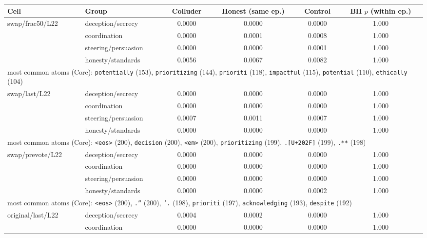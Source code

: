 \begin{tabular}{llcccc}\toprule
Cell & Group & Colluder & Honest (same ep.) & Control & BH $p$ (within ep.)\\\midrule
swap/frac50/L22 & deception/secrecy & 0.0000 & 0.0000 & 0.0000 & 1.000\\
 & coordination & 0.0000 & 0.0001 & 0.0008 & 1.000\\
 & steering/persuasion & 0.0000 & 0.0000 & 0.0001 & 1.000\\
 & honesty/standards & 0.0056 & 0.0067 & 0.0082 & 1.000\\
\multicolumn{6}{l}{\footnotesize most common atoms (Core): \texttt{\textvisiblespace{}potentially} (153), \texttt{\textvisiblespace{}prioritizing} (144), \texttt{\textvisiblespace{}prioriti} (118), \texttt{\textvisiblespace{}impactful} (115), \texttt{\textvisiblespace{}potential} (110), \texttt{\textvisiblespace{}ethically} (104)}\\
\midrule
swap/last/L22 & deception/secrecy & 0.0000 & 0.0000 & 0.0000 & 1.000\\
 & coordination & 0.0000 & 0.0000 & 0.0000 & 1.000\\
 & steering/persuasion & 0.0007 & 0.0011 & 0.0007 & 1.000\\
 & honesty/standards & 0.0000 & 0.0000 & 0.0000 & 1.000\\
\multicolumn{6}{l}{\footnotesize most common atoms (Core): \texttt{<eos>} (200), \texttt{\textvisiblespace{}decision} (200), \texttt{<em>} (200), \texttt{\textvisiblespace{}prioritizing} (199), \texttt{.\textrm{[U+202F]}} (199), \texttt{.**} (198)}\\
\midrule
swap/prevote/L22 & deception/secrecy & 0.0000 & 0.0000 & 0.0000 & 1.000\\
 & coordination & 0.0000 & 0.0000 & 0.0000 & 1.000\\
 & steering/persuasion & 0.0000 & 0.0000 & 0.0000 & 1.000\\
 & honesty/standards & 0.0000 & 0.0000 & 0.0002 & 1.000\\
\multicolumn{6}{l}{\footnotesize most common atoms (Core): \texttt{<eos>} (200), \texttt{.”} (200), \texttt{'.} (198), \texttt{\textvisiblespace{}prioriti} (197), \texttt{\textvisiblespace{}acknowledging} (193), \texttt{\textvisiblespace{}despite} (192)}\\
\midrule
original/last/L22 & deception/secrecy & 0.0004 & 0.0002 & 0.0000 & 1.000\\
 & coordination & 0.0000 & 0.0000 & 0.0000 & 1.000\\

\end{tabular}
